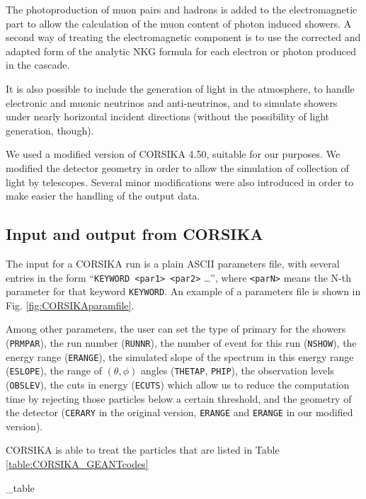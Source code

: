 The photoproduction of muon pairs and hadrons is added to the
electromagnetic part to allow the calculation of the muon content of
photon induced showers. A second way of treating the electromagnetic
component is to use the corrected and adapted form of the analytic NKG
formula for each electron or photon produced in the cascade.

It is also possible to include the generation of \Cherenkov light in
the atmosphere, to handle electronic and muonic neutrinos and
anti-neutrinos, and to simulate showers under nearly horizontal
incident directions (without the possibility of \Cherenkov light
generation, though).

We used a modified version of CORSIKA 4.50, suitable for our purposes.
We modified the detector geometry in order to allow the simulation of
collection of light by \Cherenkov telescopes. Several minor
modifications were also introduced in order to make easier the
handling of the output data.

\subsection{Input and output from CORSIKA}
%
The input for a CORSIKA run is a plain ASCII parameters file, with
several entries in the form ``\texttt{KEYWORD <par1> <par2>} \ldots'',
where \texttt{<parN>} means the N-th parameter for that keyword
\texttt{KEYWORD}. An example of a parameters file is shown in Fig.
\ref{fig:CORSIKAparamfile}.

\CORSIKAsampleInputfig

Among other parameters, the user can set the type of primary for the
showers (\texttt{PRMPAR}), the run number (\texttt{RUNNR}), the number
of event for this run (\texttt{NSHOW}), the energy range
(\texttt{ERANGE}), the simulated slope of the spectrum in this energy
range (\texttt{ESLOPE}), the range of $(\theta,\phi)$ angles
(\texttt{THETAP}, \texttt{PHIP}), the observation levels
(\texttt{OBSLEV}), the cuts in energy (\texttt{ECUTS}) which allow us
to reduce the computation time by rejecting those particles below a
certain threshold, and the geometry of the detector (\texttt{CERARY}
in the original version, \texttt{ERANGE} and \texttt{ERANGE} in our
modified version).

CORSIKA is able to treat the particles that are listed in Table
\ref{table:CORSIKA_GEANTcodes}

\CORSIKAGeantcodes_table

